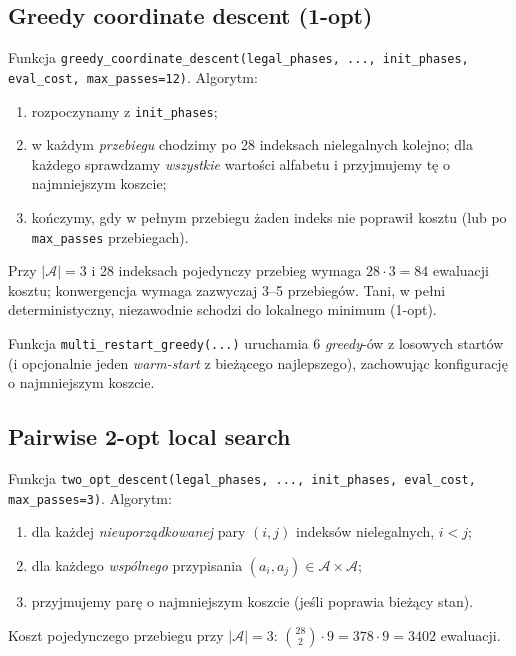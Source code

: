 \documentclass[11pt,a4paper]{article}
\newcommand{\1}{\mathbf{1}}
\newcommand{\Alphabet}{\mathcal{A}}
\newcommand{\code}[1]{\texttt{#1}}
\begin{document}
\subsection{Greedy coordinate descent (1-opt)}
\label{sec:greedy}

Funkcja \code{greedy\_coordinate\_descent(legal\_phases, ...,
init\_phases, eval\_cost, max\_passes=12)}. Algorytm:
\begin{enumerate}[leftmargin=*]
  \item rozpoczynamy z \code{init\_phases};
  \item w każdym \emph{przebiegu} chodzimy po 28 indeksach nielegalnych
        kolejno; dla każdego sprawdzamy \emph{wszystkie} wartości
        alfabetu i przyjmujemy tę o najmniejszym koszcie;
  \item kończymy, gdy w pełnym przebiegu żaden indeks nie poprawił
        kosztu (lub po \code{max\_passes} przebiegach).
\end{enumerate}
Przy $|\Alphabet|=3$ i 28 indeksach pojedynczy przebieg wymaga
$28\cdot 3=84$ ewaluacji kosztu; konwergencja wymaga zazwyczaj 3--5
przebiegów. Tani, w pełni deterministyczny, niezawodnie schodzi do
lokalnego minimum (1-opt).

Funkcja \code{multi\_restart\_greedy(...)} uruchamia 6 \emph{greedy}-ów
z losowych startów (i opcjonalnie jeden \emph{warm-start} z bieżącego
najlepszego), zachowując konfigurację o najmniejszym koszcie.

\subsection{Pairwise 2-opt local search}
\label{sec:2opt}

Funkcja \code{two\_opt\_descent(legal\_phases, ..., init\_phases,
eval\_cost, max\_passes=3)}. Algorytm:
\begin{enumerate}[leftmargin=*]
  \item dla każdej \emph{nieuporządkowanej} pary $(i,j)$ indeksów
        nielegalnych, $i<j$;
  \item dla każdego \emph{wspólnego} przypisania
        $(a_{i}, a_{j})\in\Alphabet\times\Alphabet$;
  \item przyjmujemy parę o najmniejszym koszcie (jeśli poprawia
        bieżący stan).
\end{enumerate}
Koszt pojedynczego przebiegu przy $|\Alphabet|=3$:
$\binom{28}{2}\cdot 9 = 378\cdot 9 = 3402$ ewaluacji.
\end{document}
